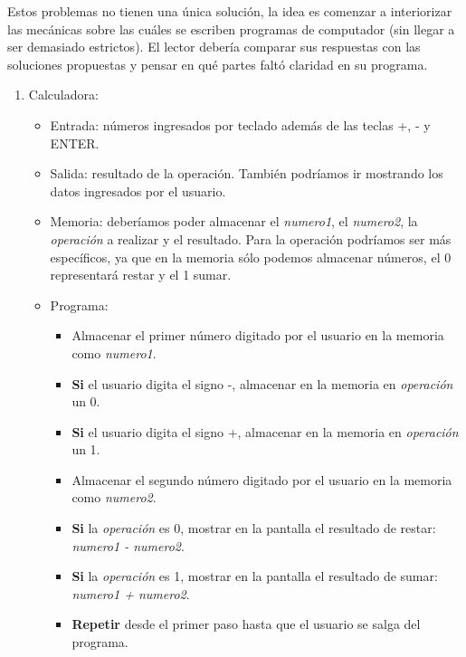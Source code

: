 \begin{Answer}	
	
Estos problemas no tienen una única solución, la idea es comenzar a interiorizar las mecánicas sobre las cuáles se escriben programas de computador (sin llegar a ser demasiado estrictos). El lector debería comparar sus respuestas con las soluciones propuestas y pensar en qué partes faltó claridad en su programa.
		
\begin{enumerate}
\item Calculadora:
	\begin{itemize}
		\item Entrada: números ingresados por teclado además de las teclas +, - y ENTER.
		\item Salida: resultado de la operación. También podríamos ir mostrando los datos ingresados por el usuario.
		\item Memoria: deberíamos poder almacenar el \emph{numero1}, el \emph{numero2}, la \emph{operación} a realizar y el resultado. Para la operación podríamos ser más específicos, ya que en la memoria sólo podemos almacenar números, el 0 representará restar y el 1 sumar.
		\item Programa:
		\begin{itemize}
			\item Almacenar el primer número digitado por el usuario en la memoria como  \emph{numero1}.					
			\item \textbf{Si} el usuario digita el signo -, almacenar en la memoria en \emph{operación} un 0.
			\item \textbf{Si} el usuario digita el signo +, almacenar en la memoria en \emph{operación} un 1.
			\item Almacenar el segundo número digitado por el usuario en la memoria como  \emph{numero2}.
			\item \textbf{Si} la \emph{operación} es 0, mostrar en la pantalla el resultado de restar: \emph{numero1 - numero2}.					
			\item \textbf{Si} la \emph{operación} es 1, mostrar en la pantalla el resultado de sumar: \emph{numero1 + numero2}.
			\item \textbf{Repetir} desde el primer paso hasta que el usuario se salga del programa.
		\end{itemize}
		
	\end{itemize}
	

\end{enumerate}
\end{Answer}
